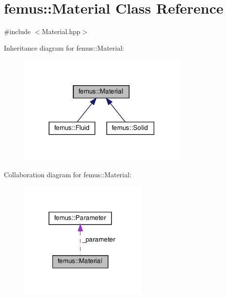 \hypertarget{classfemus_1_1_material}{}\section{femus\+:\+:Material Class Reference}
\label{classfemus_1_1_material}


{\ttfamily \#include $<$Material.\+hpp$>$}



Inheritance diagram for femus\+:\+:Material\+:
\nopagebreak
\begin{figure}[H]
\begin{center}
\leavevmode
\includegraphics[width=242pt]{classfemus_1_1_material__inherit__graph}
\end{center}
\end{figure}


Collaboration diagram for femus\+:\+:Material\+:
\nopagebreak
\begin{figure}[H]
\begin{center}
\leavevmode
\includegraphics[width=184pt]{classfemus_1_1_material__coll__graph}
\end{center}
\end{figure}
